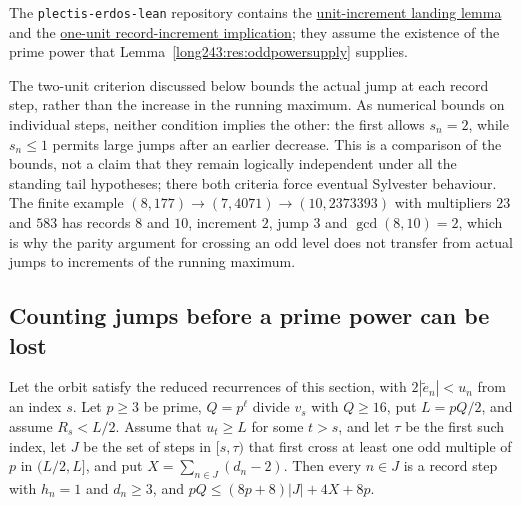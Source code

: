\documentclass[11pt]{article}
\begin{document}
The \texttt{plectis-erdos-lean} repository contains the
\href{https://github.com/wcook04/plectis-erdos-lean/blob/52f29ad173b04e3bac941b3663f2b9aebe5de0bb/ErdosProblems/Erdos243/RecordIncrementBarrier.lean\#L329}{unit-increment landing lemma} and the
\href{https://github.com/wcook04/plectis-erdos-lean/blob/52f29ad173b04e3bac941b3663f2b9aebe5de0bb/ErdosProblems/Erdos243/RecordIncrementBarrier.lean\#L425}{one-unit record-increment implication};
they assume the existence of the prime power that
Lemma~\ref{long243:res:oddpowersupply} supplies.


The two-unit criterion discussed below bounds the actual jump at each
record step, rather than the increase in the running maximum. As numerical
bounds on individual steps, neither condition implies the other: the first
allows $s_n=2$, while $s_n\le1$ permits large jumps after an earlier
decrease. This is a comparison of the bounds, not a claim that they remain
logically independent under all the standing tail hypotheses; there both
criteria force eventual Sylvester behaviour.
The finite example
$(8,177)\to(7,4071)\to(10,2373393)$ with multipliers $23$ and $583$ has records
$8$ and $10$, increment $2$, jump $3$ and $\gcd(8,10)=2$, which is why the
parity argument for crossing an odd level does not transfer from actual
jumps to increments of the running maximum.

\subsection{Counting jumps before a prime power can be lost}

\begin{theorem}\label{long243:res:epochenergy}
Let the orbit satisfy the reduced recurrences of this section, with
$2|\tilde e_n|<u_n$ from an
index $s$.  Let $p\ge3$ be prime, $Q=p^{\ell}$ divide $v_s$ with $Q\ge16$, put
$L=pQ/2$, and assume $R_s<L/2$. Assume that $u_t\ge L$ for some $t>s$,
and let $\tau$ be the first such index, let $J$ be the set of steps in $[s,\tau)$ that first cross at least one odd
multiple of $p$ in $(L/2,L]$, and put $X=\sum_{n\in J}(d_n-2)$.  Then every
$n\in J$ is a record step with $h_n=1$ and $d_n\ge3$, and
$pQ\le(8p+8)\lvert J\rvert+4X+8p$.
\end{theorem}
\end{document}
